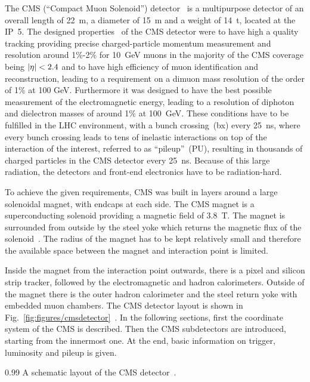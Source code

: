 The CMS (``Compact Muon Solenoid'') detector~\cite{Chatrchyan:2008aa} is a multipurpose detector of an overall length of 22~m, a diameter of 15~m and a weight of 14~t, located at the IP~5. The designed properties~\cite{CMSproposal} of the CMS  detector were to have high a quality tracking providing precise charged-particle momentum measurement and resolution around 1\%-2\% for 10~GeV muons in the majority of the CMS coverage being $\abs{\eta}<2.4$ and to have high efficiency of muon identification and reconstruction, leading to a requirement on  a dimuon mass resolution of the order of 1\% at 100 GeV. Furthermore it was designed to have the best possible measurement of the electromagnetic energy, leading to a resolution of diphoton and dielectron masses of around 1\% at 100~GeV. These conditions have to be fulfilled in the LHC environment, with a bunch crossing~(bx) every 25~ns, where every bunch crossing leads to tens of inelastic interactions on top of the interaction of the interest, referred to as ``pileup''~(PU), resulting in thousands of charged particles in the CMS detector every 25~ns. Because of this large radiation, the detectors and front-end electronics have to be radiation-hard.

To achieve the given requirements, CMS was built in layers around a large solenoidal magnet, with endcaps at each side. The CMS magnet is a superconducting solenoid providing a magnetic field of 3.8~T. The magnet is surrounded from outside by the steel yoke which returns the magnetic flux of the solenoid~\cite{tdrMagnet}. The radius of the magnet has to be kept relatively small and therefore the available space between the magnet and interaction point is limited.

Inside the magnet from the interaction point outwards, there is a pixel and silicon strip tracker, followed by the electromagnetic and hadron calorimeters. Outside of the magnet there is the outer hadron calorimeter and the steel return yoke with embedded muon chambers. The CMS detector layout is shown in Fig.~\ref{fig:figures/cmsdetector}~\cite{website:CMSdet}. In the following sections, first the coordinate system of the CMS is described. Then the CMS subdetectors are introduced, starting from the innermost one. At the end, basic information on trigger, luminosity and pileup is given.


                 {0.99}       %
                 { A schematic layout of the CMS detector~\cite{website:CMSdet}. }

